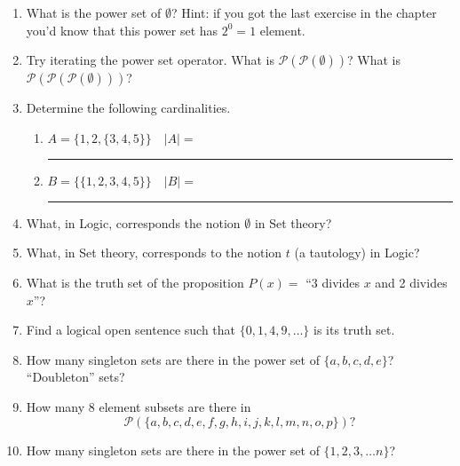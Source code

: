 \begin{enumerate}
\item What is the power set of $\emptyset$?  Hint: if you got the last exercise
in the chapter you'd know that this power set has $2^0 = 1$ element.


\item Try iterating the power set operator.  What is ${\mathcal P}({\mathcal P}(\emptyset))$?  What is ${\mathcal P}({\mathcal P}({\mathcal P}(\emptyset)))$?


\item Determine the following cardinalities.
  \begin{enumerate}
    \item $A = \{ 1, 2, \{3, 4, 5\}\} \quad |A| = $\rule{36pt}{1pt}
    \item $B = \{ \{1, 2, 3, 4, 5\} \} \quad |B| = $\rule{36pt}{1pt}  
  \end{enumerate}


\item What, in Logic, corresponds the notion $\emptyset$ in Set theory?


\item What, in Set theory, corresponds to the notion $t$ (a tautology) in Logic?


\item What is the truth set of the proposition $P(x) = $ ``3 divides $x$ and 2 divides $x$''?


\item Find a logical open sentence such that $\{0, 1, 4, 9, \ldots \}$ is
its truth set.


\item How many singleton sets are there in the power set of 
$\{a,b,c,d,e\}$?  ``Doubleton'' sets?


\item How many 8 element subsets are there in
\[ {\mathcal P}(\{a,b,c,d,e,f,g,h,i,j,k,l,m,n,o,p\})? \]


\item How many singleton sets are there in the power set of 
$\{1,2,3, \ldots n\}$?


\end{enumerate}




